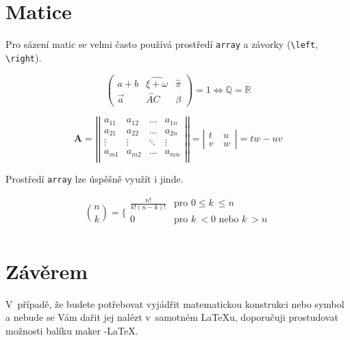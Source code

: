 \documentclass[11pt, a4paper]{article}
\theoremstyle{definition}
\begin{document}
\begin{twocolumn}
\section{Matice}
Pro sázení matic se velmi často používá prostředí \verb|array| a závorky (\verb|\left|, \verb|\right|).

$$ \left(
\begin{array}{ccc}
    a + b & \widehat{\xi + \omega} & \hat{\pi}\\
    \overset{\rightarrow}{a} & \overleftrightarrow{AC} & \beta 
\end{array}
\right)
= 1 \Longleftrightarrow \mathbb{Q} = \mathbb{R}$$

$$
\textbf{A} = 
\left| \left|
\begin{array}{cccc}
a_{11} & a_{12} & \dots & a_{1n} \\
a_{21} & a_{22} & \dots & a_{2n} \\
\vdots & \vdots & \ddots & \vdots \\
a_{m1} & a_{m2} & \dots & a_{mn} \\
\end{array}
\right| \right|
=
\left|
\begin{array}{cc}
    t & u~\\
    v~& w
\end{array}
\right|
= tw - uv
$$

Prostředí \verb|array| lze úspěšně využít i jinde.

$$
\binom{n}{k}
=
\Bigg\{
\begin{array}{ll}
    \frac{n!}{k!(n-k)!} & \text{pro } 0 \leq k~\leq n\ \\
    0 & \text{pro } k~< 0 \text{ nebo } k~> n \\
\end{array}
$$

\section{Závěrem}

V~případě, že budete potřebovat vyjádřit matematickou konstrukci nebo symbol a nebude se Vám dařit jej nalézt v~samotném \LaTeX u, doporučuji prostudovat možnosti balíku maker \AmS-\LaTeX.

\end{twocolumn}
\end{document}
